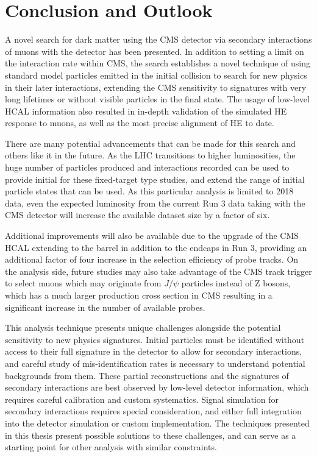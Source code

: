 \chapter{Conclusion and Outlook}
\label{conclusion_chapter}

A novel search for dark matter using the CMS detector via secondary interactions of muons with the detector has been presented.
In addition to setting a limit on the \dbrem interaction rate within CMS, the search establishes a novel technique of using standard model particles emitted in the initial collision to search for new physics in their later interactions, extending the CMS sensitivity to signatures with very long lifetimes or without visible particles in the final state.
The usage of low-level HCAL information also resulted in in-depth validation of the simulated HE response to muons, as well as the most precise alignment of HE to date.

There are many potential advancements that can be made for this search and others like it in the future. 
As the LHC transitions to higher luminosities, the huge number of particles produced and interactions recorded can be used to provide initial for these fixed-target type studies, and extend the range of initial particle states that can be used.
As this particular analysis is limited to 2018 data, even the expected luminosity from the current Run 3 data taking with the CMS detector will increase the available dataset size by a factor of six.

Additional improvements will also be available due to the upgrade of the CMS HCAL extending to the barrel in addition to the endcaps in Run 3, providing an additional factor of four increase in the selection efficiency of probe tracks.
On the analysis side, future studies may also take advantage of the CMS track trigger to select muons which may originate from $J/\psi$ particles instead of Z bosons, which has a much larger production cross section in CMS resulting in a significant increase in the number of available probes.

This analysis technique presents unique challenges alongside the potential sensitivity to new physics signatures. 
Initial particles must be identified without access to their full signature in the detector to allow for secondary interactions, and careful study of mis-identification rates is necessary to understand potential backgrounds from them.
These partial reconstructions and the signatures of secondary interactions are best observed by low-level detector information, which requires careful calibration and custom systematics.
Signal simulation for secondary interactions requires special consideration, and either full integration into the detector simulation or custom implementation.
The techniques presented in this thesis present possible solutions to these challenges, and can serve as a starting point for other analysis with similar constraints.

